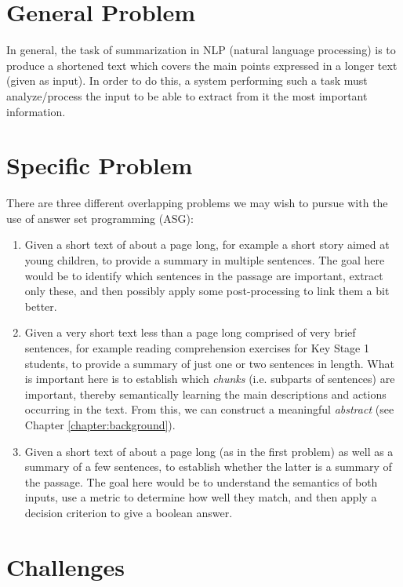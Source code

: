 \label{chapter:introduction}

\section{General Problem}

In general, the task of summarization in NLP (natural language processing) is to produce a shortened text which covers the main points expressed in a longer text (given as input). In order to do this, a system performing such a task must analyze/process the input to be able to extract from it the most important information.

\section{Specific Problem}

There are three different overlapping problems we may wish to pursue with the use of answer set programming (ASG):

\begin{enumerate}
\item Given a short text of about a page long, for example a short story aimed at young children, to provide a summary in multiple sentences. The goal here would be to identify which sentences in the passage are important, extract only these, and then possibly apply some post-processing to link them a bit better.
\item Given a very short text less than a page long comprised of very brief sentences, for example reading comprehension exercises for Key Stage 1 students, to provide a summary of just one or two sentences in length. What is important here is to establish which \textit{chunks} (i.e. subparts of sentences)  are important, thereby semantically learning the main descriptions and actions occurring in the text. From this, we can construct a meaningful \textit{abstract} (see Chapter \ref{chapter:background}).
\item Given a short text of about a page long (as in the first problem) as well as a summary of a few sentences, to establish whether the latter is a summary of the passage. The goal here would be to understand the semantics of both inputs, use a metric to determine how well they match, and then apply a decision criterion to give a boolean answer.
\end{enumerate}

\section{Challenges}

